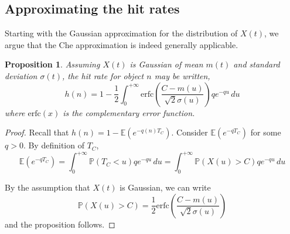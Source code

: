 \documentclass{amsart}
\newtheorem{proposition}{Proposition}
\def\P{{\mathbb P}}
\def\E{{\mathbb E}}
\begin{document}
\subsection{Approximating the hit rates}
Starting with the Gaussian approximation for the distribution of $X(t)$, we argue that the Che approximation is indeed generally applicable.



\begin{proposition}
\label{prop:erfc}
Assuming $X(t)$ is Gaussian of mean $m(t)$ and standard deviation $\sigma(t)$, the hit rate for object $n$ may be written,
\begin{equation}
h(n) = 1 - \frac{1}{2}\int_0^{+\infty} \mathrm{erfc}\left(\frac{C-m(u)}{\sqrt{2}\sigma(u)}\right) qe^{-q u}\,du
\label{eq:erfc}
\end{equation}
where $\mathrm{erfc}(x)$ is the complementary error function.
\end{proposition}

\begin{proof}
Recall that $h(n)=1-\E\left(e^{-q(n) T_C}\right)$. Consider $\E\left(e^{-q T_C}\right)$ for some $q>0$.
By definition of $T_C$,
\[
\E\left(e^{-q T_C}\right)=\int_0^{+\infty} \P(T_C<u) qe^{-q u}\,du=\int_0^{+\infty} \P(X(u)>C) qe^{-q u}\,du
\]

By the assumption that $X(t)$ is Gaussian, we can write
$$\P(X(u)>C) = \frac{1}{2}\mathrm{erfc}\left(\frac{C-m(u)}{\sqrt{2}\sigma(u)}\right) $$
and the proposition follows.
\end{proof}
\end{document}
